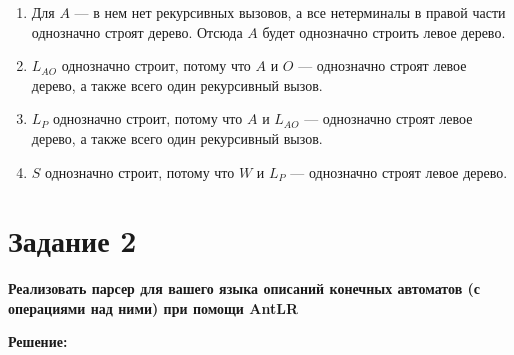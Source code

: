 \documentclass{article}
\begin{document}
\begin{enumerate}
		\item Для $A$ --- в нем нет рекурсивных вызовов, а все нетерминалы в правой части однозначно строят дерево. Отсюда $A$ будет однозначно строить левое дерево.
		
		\item $L_{AO}$ однозначно строит, потому что $A$ и $O$ --- однозначно строят левое дерево, а также всего один рекурсивный вызов.
		
		\item $L_{P}$ однозначно строит, потому что $A$ и $L_{AO}$ --- однозначно строят левое дерево, а также всего один рекурсивный вызов.
		
		\item $S$ однозначно строит, потому что $W$ и $L_{P}$ --- однозначно строят левое дерево.
		
		
	
\end{enumerate}



	\section*{Задание 2}

{\bfseries Реализовать парсер для вашего языка описаний конечных автоматов (с операциями над ними) при помощи AntLR}

\begin{center}
	\textbf{Решение:}
\end{center}
\end{document}
